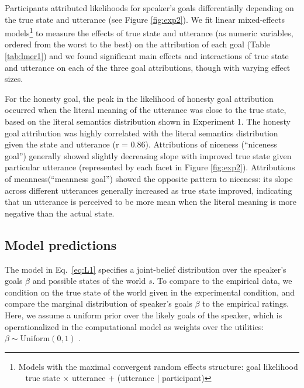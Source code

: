 \documentclass[10pt,letterpaper]{article}
\newcommand{\ndg}[1]{\textcolor{Green}{[ndg: #1]}}
\begin{document}

Participants attributed likelihoods for speaker's goals differentially depending on the true state and utterance (see Figure \ref{fig:exp2}). We fit linear mixed-effects models\footnote{Models with the maximal convergent random effects structure: goal likelihood ~ true state $\times$ utterance + (utterance $|$ participant)} to measure the effects of true state and utterance (as numeric variables, ordered from the worst to the best) on the attribution of each goal (Table \ref{tab:lmer1}) and we found significant main effects and interactions of true state and utterance on each of the three goal attributions, though with varying effect sizes. 

For the honesty goal, the peak in the likelihood of honesty goal attribution occurred when the literal meaning of the utterance was close to the true state, based on the literal semantics distribution shown in Experiment 1. The honesty goal attribution was highly correlated with the literal semantics distribution given the state and utterance (r = 0.86). Attributions of niceness (``niceness goal'') generally showed slightly decreasing slope with improved true state given particular utterance (represented by each facet in Figure \ref{fig:exp2}). Attributions of meanness(``meanness goal'') showed the opposite pattern to niceness: its slope across different utterances generally increased as true state improved, indicating that un utterance is perceived to be more mean when the literal meaning is more negative than the actual state.

\subsection{Model predictions}

The model in Eq.~\ref{eq:L1} specifies a joint-belief distribution over the speaker's goals $\beta$ and possible states of the world $s$.
To compare to the empirical data, we condition on the true state of the world given in the experimental condition, and compare the marginal distribution of speaker's goals $\beta$ to the empirical ratings.
Here, we assume a uniform prior over the likely goals of the speaker, which is operationalized in the computational model as weights over the utilities: $\beta \sim \text{Uniform}(0,1)$ .
\end{document}
